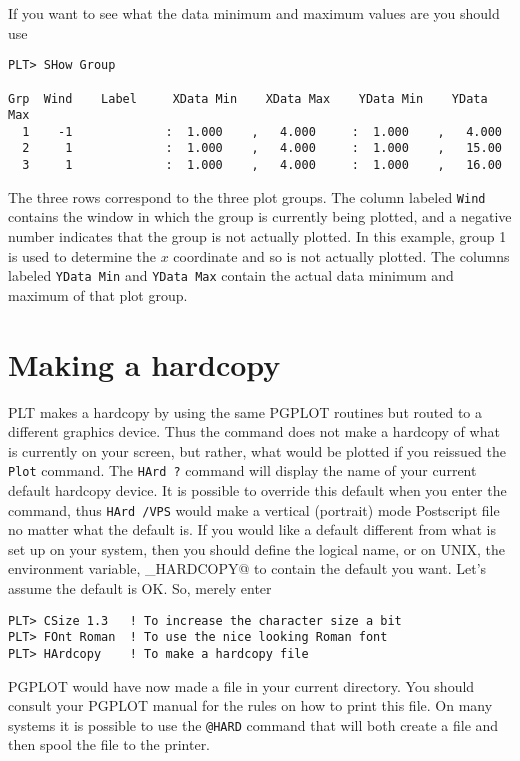 If you want to see what the data minimum and maximum values are
you should use
\begin{verbatim}
PLT> SHow Group

Grp  Wind    Label     XData Min    XData Max    YData Min    YData Max
  1    -1             :  1.000    ,   4.000     :  1.000    ,   4.000
  2     1             :  1.000    ,   4.000     :  1.000    ,   15.00
  3     1             :  1.000    ,   4.000     :  1.000    ,   16.00
\end{verbatim}
The three rows correspond to the three plot groups.
The column labeled {\tt Wind} contains the window in which the group is
currently being plotted, and a negative number indicates that the
group is not actually plotted.
In this example, group 1 is used to determine the $x$ coordinate and
so is not actually plotted.
The columns labeled {\tt YData Min} and {\tt YData Max} contain
the actual data minimum and maximum of that plot group.

\section{Making a hardcopy}
PLT makes a hardcopy by using the same PGPLOT routines but routed
to a different graphics device.
Thus the command does not make a hardcopy of what is currently on
your screen,
but rather, what would be plotted if you reissued the {\tt Plot} command.
The {\tt HArd~?} command will display the name of your current
default hardcopy device.
It is possible to override this default when you enter the \verb@HArd@
command, thus {\tt HArd /VPS} would make a vertical (portrait) mode
Postscript file no matter what the default is.
If you would like a default different from what is set up on your system,
then you should define the logical name, or on UNIX, the environment
variable, \verb@PLT_HARDCOPY@ to contain the default you want.
Let's assume the default is OK\@.
So, merely enter
\begin{verbatim}
PLT> CSize 1.3   ! To increase the character size a bit
PLT> FOnt Roman  ! To use the nice looking Roman font
PLT> HArdcopy    ! To make a hardcopy file
\end{verbatim}
PGPLOT would have now made a file in your current directory.
You should consult your PGPLOT manual
for the rules on how to print this file.
On many systems it is possible to use the {\tt @HARD} command that
will both create a file and then spool the file to the printer.

